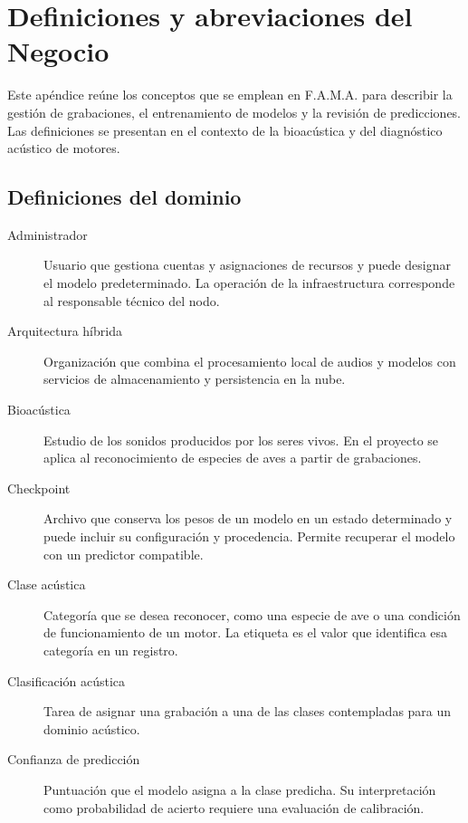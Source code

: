 \chapter{Definiciones y abreviaciones del Negocio}
\label{ap:definiciones-negocio}

Este apéndice reúne los conceptos que se emplean en F.A.M.A. para describir
la gestión de grabaciones, el entrenamiento de modelos y la revisión de
predicciones. Las definiciones se presentan en el contexto de la
bioacústica y del diagnóstico acústico de motores.

\section{Definiciones del dominio}

\begin{description}
    \item[Administrador] Usuario que gestiona cuentas y asignaciones de
    recursos y puede designar el modelo predeterminado. La operación de la
    infraestructura corresponde al responsable técnico del nodo.

    \item[Arquitectura híbrida] Organización que combina el procesamiento
    local de audios y modelos con servicios de almacenamiento y persistencia
    en la nube.

    \item[Bioacústica] Estudio de los sonidos producidos por los seres vivos.
    En el proyecto se aplica al reconocimiento de especies de aves a partir
    de grabaciones.

    \item[Checkpoint] Archivo que conserva los pesos de un modelo en un
    estado determinado y puede incluir su configuración y procedencia.
    Permite recuperar el modelo con un predictor compatible.

    \item[Clase acústica] Categoría que se desea reconocer, como una especie
    de ave o una condición de funcionamiento de un motor. La etiqueta es
    el valor que identifica esa categoría en un registro.

    \item[Clasificación acústica] Tarea de asignar una grabación a una de
    las clases contempladas para un dominio acústico.

    \item[Confianza de predicción] Puntuación que el modelo asigna a la clase
    predicha. Su interpretación como probabilidad de acierto requiere una
    evaluación de calibración.


\end{description}
